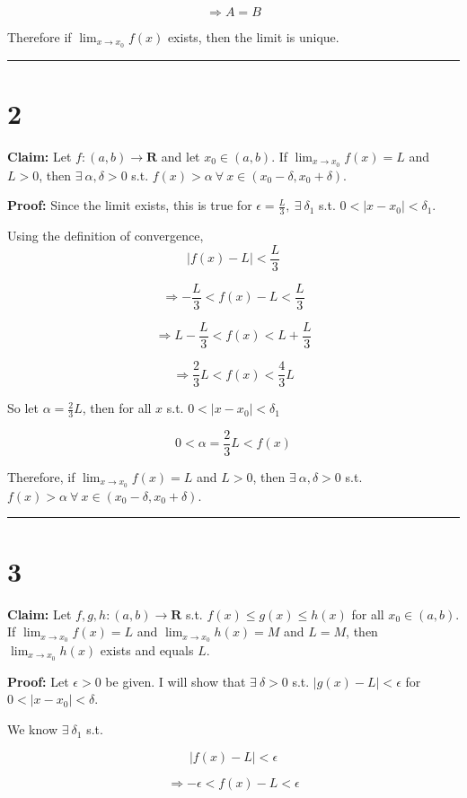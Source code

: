 \documentclass[10pt,letterpaper]{article}
\newcommand\R{\mathbf{R}}
\newcommand\ds{\displaystyle}
\newcommand\qedsym{\hfill \rule{2mm}{2mm}}
\begin{document}
\[\Rightarrow A=B\]

Therefore if $\ds\lim_{x\to x_0} f(x)$ exists, then the limit is unique. \qedsym

\section*{2}

\textbf{Claim:} Let $f:(a, b)\rightarrow\R$ and let $x_0\in(a, b)$. If $\ds\lim_{x\to x_0} f(x) = L$ and $L>0$, then $\exists\ \alpha, \delta>0$ s.t. $f(x)>\alpha\ \forall\ x\in(x_0-\delta, x_0+\delta)$.

\medskip

\textbf{Proof:} Since the limit exists, this is true for $\epsilon = \frac{L}{3},\ \exists\ \delta_1$ s.t. $0<|x-x_0| < \delta_1$.

Using the definition of convergence,
\[|f(x) - L| < \frac{L}{3}\]

\[\Rightarrow -\frac{L}{3} < f(x) - L < \frac{L}{3}\]

\[\Rightarrow L-\frac{L}{3} < f(x) < L+\frac{L}{3}\]

\[\Rightarrow \frac{2}{3}L < f(x) < \frac{4}{3}L\]

So let $\alpha = \frac{2}{3}L$, then for all $x$ s.t. $0 < |x-x_0| < \delta_1$

\[0 < \alpha = \frac{2}{3}L < f(x)\]

Therefore, if $\ds\lim_{x\to x_0} f(x) = L$ and $L>0$, then $\exists\ \alpha, \delta>0$ s.t. $f(x)>\alpha\ \forall\ x\in(x_0-\delta, x_0+\delta)$.

\qedsym

\section*{3}

\textbf{Claim:} Let $f, g, h:(a, b)\rightarrow\R$ s.t. $f(x) \leq g(x) \leq h(x)$ for all $x_0\in(a, b)$. If $\ds\lim_{x\to x_0} f(x) = L$ and $\ds\lim_{x\to x_0} h(x) = M$ and $L=M$, then $\ds\lim_{x\to x_0} h(x)$ exists and equals $L$.

\medskip

\textbf{Proof:} Let $\epsilon > 0$ be given. I will show that $\exists\ \delta > 0$ s.t. $|g(x) - L| < \epsilon$ for $0 < |x-x_0| < \delta$.

We know $\exists\ \delta_1$ s.t.

\[|f(x)-L|<\epsilon\]

\[\Rightarrow -\epsilon<f(x)-L<\epsilon\]
\end{document}

